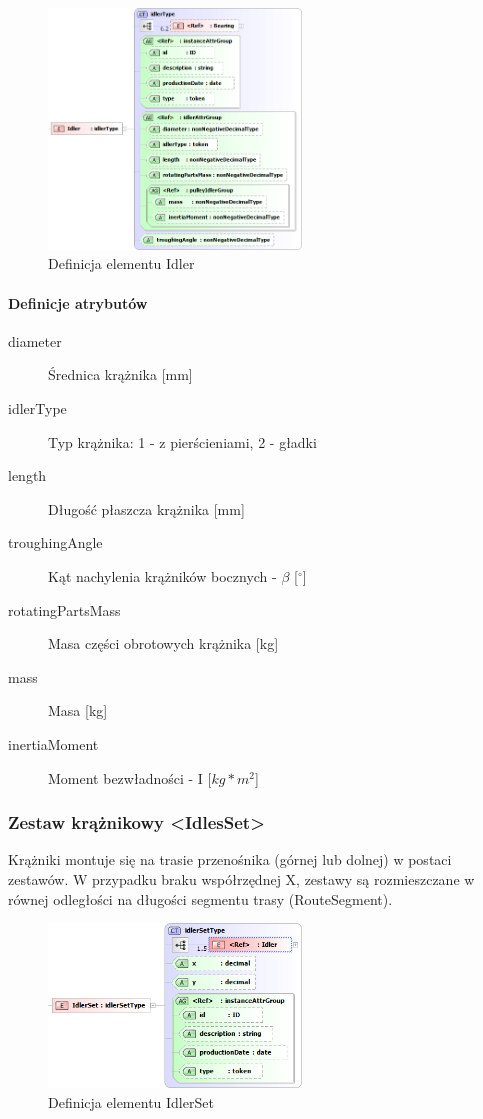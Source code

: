 \documentclass[12pt,a4paper]{article}
\begin{document}
\begin{figure}[H]
  \centering
  \includegraphics[width=0.6\textwidth]{png/liquid/Idler}
  \caption{Definicja elementu Idler}
  \label{fig:idler-xsd}
\end{figure}

\paragraph{Definicje atrybutów}
\begin{description}
\item[diameter] Średnica krążnika [mm]
\item[idlerType] Typ krążnika: 1 - z pierścieniami, 2 - gładki
\item[length] Długość płaszcza krążnika [mm]
\item[troughingAngle] Kąt nachylenia krążników bocznych - $\beta$ [$^\circ$]
\item[rotatingPartsMass] Masa części obrotowych krążnika [kg]
\item[mass] Masa [kg]
\item[inertiaMoment] Moment bezwładności - I [$kg*m^2$]
\end{description}


\subsubsection{Zestaw krążnikowy <IdlesSet>}
Krążniki montuje się na trasie przenośnika (górnej lub dolnej) w postaci
zestawów. W przypadku braku współrzędnej X, zestawy są rozmieszczane w równej
odległości na długości segmentu trasy (RouteSegment).

\begin{figure}[H]
  \centering
  \includegraphics[width=0.6\textwidth]{png/liquid/IdlerSet}
  \caption{Definicja elementu IdlerSet}
  \label{fig:idlerSet-xsd}
\end{figure}
\end{document}
